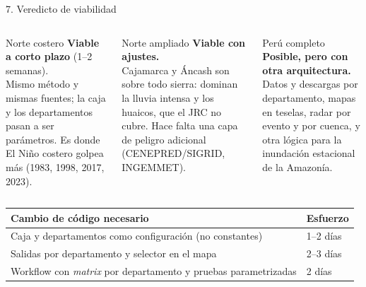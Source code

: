 \documentclass[aspectratio=169,11pt]{beamer}
\begin{document}
\begin{frame}{7. Veredicto de viabilidad}
\begin{columns}[T]
\begin{exampleblock}{Norte costero}\footnotesize
\textbf{Viable a corto plazo} (1--2 semanas).\\[2pt]
Mismo método y mismas fuentes; la caja y los departamentos pasan a ser parámetros. Es donde El Niño costero golpea más (1983, 1998, 2017, 2023).
\end{exampleblock}
\begin{block}{Norte ampliado}\footnotesize
\textbf{Viable con ajustes.}\\[2pt]
Cajamarca y Áncash son sobre todo sierra: dominan la lluvia intensa y los huaicos, que el JRC no cubre. Hace falta una capa de peligro adicional (CENEPRED/SIGRID, INGEMMET).
\end{block}
\begin{alertblock}{Perú completo}\footnotesize
\textbf{Posible, pero con otra arquitectura.}\\[2pt]
Datos y descargas por departamento, mapas en teselas, radar por evento y por cuenca, y otra lógica para la inundación estacional de la Amazonía.
\end{alertblock}
\end{columns}
\vspace{4mm}
\small
\begin{tabularx}{\textwidth}{YL{2.2cm}}\toprule
\textbf{Cambio de código necesario} & \textbf{Esfuerzo}\\\midrule
Caja y departamentos como configuración (no constantes) & 1--2 días\\
Salidas por departamento y selector en el mapa & 2--3 días\\
Workflow con \emph{matrix} por departamento y pruebas parametrizadas & 2 días\\\bottomrule
\end{tabularx}
\end{frame}
\end{document}
